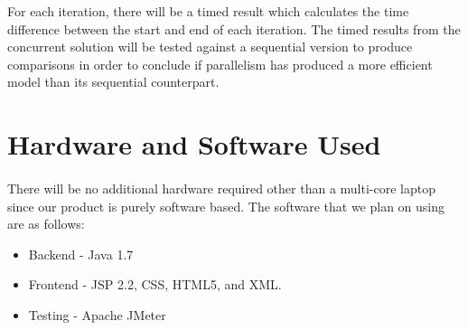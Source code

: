 \documentclass[12pt,a4paper]{report}
\begin{document}
For each iteration, there will be a timed result which calculates the time difference between the start and end of each iteration. The timed results from the concurrent solution will be tested against a sequential version to produce comparisons in order to conclude if parallelism has produced a more efficient model than its sequential counterpart.
\section{Hardware and Software Used}
\paragraph{}
There will be no additional hardware required other than a multi-core laptop since our product is purely software based.
The software that we plan on using are as follows: 
\begin{itemize}
\item Backend - Java 1.7
\item Frontend - JSP 2.2, CSS, HTML5, and XML.
\item Testing - Apache JMeter
\end{itemize}
\end{document}

